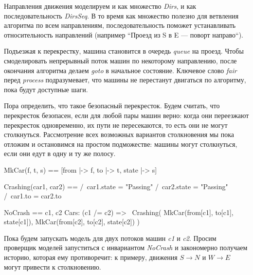 \documentclass[14pt, openany]{report}
\begin{document}
Направления движения моделируем и как множество \emph{Dirs}, и как последовательность \emph{DirsSeq}. В то время как множество полезно для ветвления алгоритма по всем направлениям, последовательность поможет устанавливать относительность направлений (например ``Проезд из S в E --- поворт направо``).

Подъезжая к перекрестку, машина становится в очередь \emph{queue} на проезд. Чтобы смоделировать непрерывный поток машин по некоторому направлению, после окончания алгоритма делаем \emph{goto} в начальное состояние. Ключевое слово \emph{fair} перед \emph{process} подразумевает, что машины не перестанут двигаться по алгоритму, пока будут доступные шаги.

Пора определить, что такое безопасный перекресток. Будем считать, что перекресток безопасен, если для любой пары машин верно: когда они переезжают перекресток одновременно, их пути не пересекаются, то есть они не могут столкнуться. Рассмотрение всех возможных вариантов столкновения мы пока отложим и остановимся на простом подможестве: машины могут столкнуться, если они едут в одну и ту же полосу.

\begin{tla}
  MkCar(f, t, s) == [from |-> f, to |-> t, state |-> s]

  Crashing(car1, car2) == 
    /\ car1.state = "Passing" 
    /\ car2.state = "Passing" 
    /\ car1.to = car2.to  

  NoCrash == 
    \A c1, c2 \in Cars:
    (c1 /= c2) => ~Crashing(
      MkCar(from[c1], to[c1], state[c1]), 
      MkCar(from[c2], to[c2], state[c2])
    )
\end{tla}
\begin{tlatex}
\@pvspace{8.0pt}%
%
%
%
%
\@pvspace{8.0pt}%
%
%
%
%
%
%
\end{tlatex}

Пока будем запускать модель для двух потоков машин \emph{c1} и \emph{c2}.
Просим проверщик моделей запуститься с инвариантом \emph{NoCrash} и закономерно получаем историю, которая ему противоречит: к примеру, движения \(S \rightarrow N\) и \(W \rightarrow E\) могут привести к столкновению.
\end{document}
